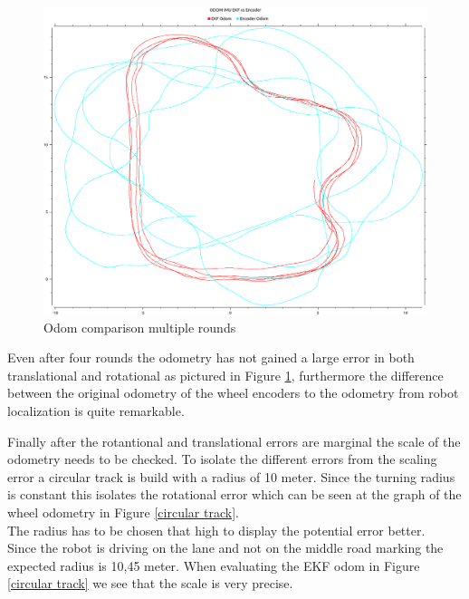 \begin{figure}
	\includegraphics[width=\textwidth]{Pictures/odom comp multiple rounds}
	\caption{Odom comparison multiple rounds}
	\label{Odom comparison multiple rounds}

\end{figure}

Even after four rounds the odometry has not gained a large error in both translational and rotational as pictured in Figure \ref{Odom comparison multiple rounds}, furthermore the difference between the original odometry of the wheel encoders to the odometry from robot localization is quite remarkable.

Finally after the rotantional and translational errors are marginal the scale of the odometry needs to be checked.
To isolate the different errors from the scaling error a circular track is build with a radius of 10 meter. Since the turning radius is constant this isolates the rotational error which can be seen at the graph of the wheel odometry in Figure \ref{circular track}.\\
The radius has to be chosen that high to display the potential error better.\\

Since the robot is driving on the lane and not on the middle road marking the expected radius is 10,45 meter. When evaluating the EKF odom in Figure \ref{circular track} we see that the scale is very precise.
 
